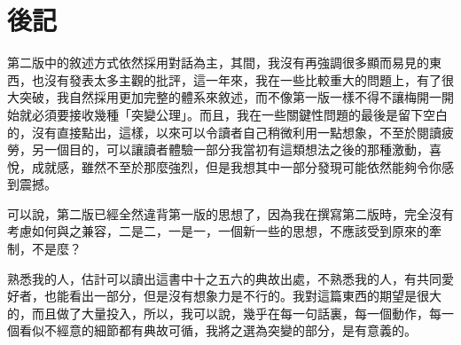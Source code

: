 \chapter{後記}
第二版中的敘述方式依然採用對話為主，其間，我沒有再強調很多顯而易見的東西，也沒有發表太多主觀的批評，這一年來，我在一些比較重大的問題上，有了很大突破，我自然採用更加完整的體系來敘述，而不像第一版一樣不得不讓梅開一開始就必須要接收幾種「突變公理」。而且，我在一些關鍵性問題的最後是留下空白的，沒有直接點出，這樣，以來可以令讀者自己稍微利用一點想象，不至於閱讀疲勞，另一個目的，可以讓讀者體驗一部分我當初有這類想法之後的那種激動，喜悅，成就感，雖然不至於那麼強烈，但是我想其中一部分發現可能依然能夠令你感到震撼。

可以說，第二版已經全然違背第一版的思想了，因為我在撰寫第二版時，完全沒有考慮如何與之兼容，二是二，一是一，一個新一些的思想，不應該受到原來的牽制，不是麼？

熟悉我的人，估計可以讀出這書中十之五六的典故出處，不熟悉我的人，有共同愛好者，也能看出一部分，但是沒有想象力是不行的。我對這篇東西的期望是很大的，而且做了大量投入，所以，我可以說，幾乎在每一句話裏，每一個動作，每一個看似不經意的細節都有典故可循，我將之選為突變的部分，是有意義的。
